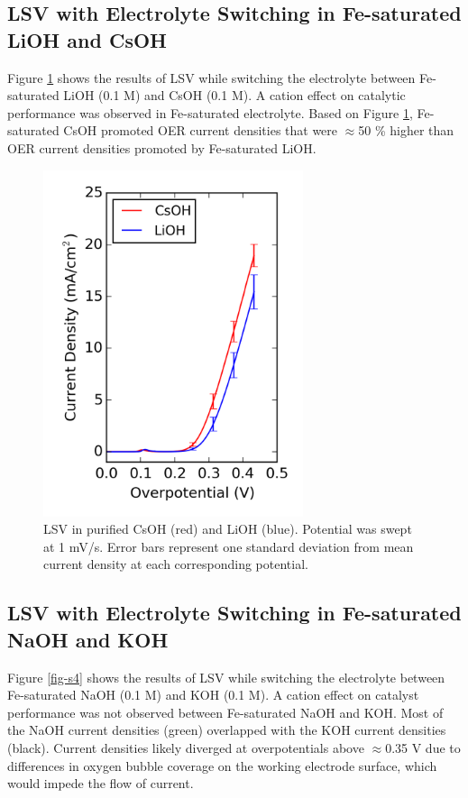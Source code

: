 \documentclass[journal=jpccck,manuscript=suppinfo,email=true]{achemso}
\begin{document}
\subsection{LSV with Electrolyte Switching in Fe-saturated LiOH and CsOH}
\label{sec-2-3}
Figure \ref{fig-s3} shows the results of LSV while switching the electrolyte between Fe-saturated LiOH (0.1 M) and CsOH (0.1 M). A cation effect on catalytic performance was observed in Fe-saturated electrolyte. Based on Figure \ref{fig-s3}, Fe-saturated CsOH promoted OER current densities that were $\approx$50 \% higher than OER current densities promoted by Fe-saturated LiOH.
\begin{figure}[h]
\centering
\includegraphics[width=3in]{./images/figures-supp-info/IvsV-Li-Cs-iron-11-21.png}
\caption{\label{fig-s3}LSV in purified CsOH (red) and LiOH (blue). Potential was swept at 1 mV/s. Error bars represent one standard deviation from mean current density at each corresponding potential.}
\end{figure}

\subsection{LSV with Electrolyte Switching in Fe-saturated NaOH and KOH}
\label{sec-2-4}
Figure \ref{fig-s4} shows the results of LSV while switching the electrolyte between Fe-saturated NaOH (0.1 M) and KOH (0.1 M). A cation effect on catalyst performance was not observed between Fe-saturated NaOH and KOH. Most of the NaOH current densities (green) overlapped with the KOH current densities (black). Current densities likely diverged at overpotentials above $\approx$0.35 V due to differences in oxygen bubble coverage on the working electrode surface, which would impede the flow of current.
\end{document}
